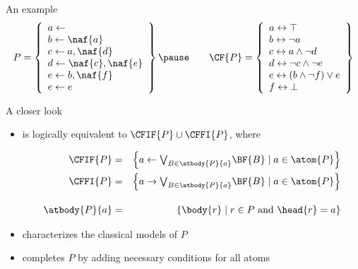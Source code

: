 \begin{frame}{An example}
\[
P
=
\left\{
  \begin{array}{l}
    a \leftarrow                  \\
    b \leftarrow \naf{a}          \\
    c \leftarrow a, \naf{d}       \\
    d \leftarrow \naf{c}, \naf{e} \\
    e \leftarrow b, \naf{f}       \\
    e \leftarrow e
  \end{array}
\right\}
\pause\qquad
\CF{P}
=
\left\{
  \begin{array}{l}
    a \leftrightarrow \top                  \\
    b \leftrightarrow \neg{a}               \\
    c \leftrightarrow a\wedge \neg{d}       \\
    d \leftrightarrow \neg{c}\wedge \neg{e} \\
    e \leftrightarrow (b\wedge \neg{f}) \vee e\\
    f \leftrightarrow \bot
  \end{array}
\right\}
\]
\end{frame}
\begin{frame}{A closer look}
  \bigskip
  \begin{itemize}
  \item {} is logically equivalent to $\CFIF{P}\cup\CFFI{P}$,
    where

    \begin{eqnarray*}
      \CFIF{P}
      & = &
      \left\{a \leftarrow \textstyle{\bigvee_{B\in\atbody{P}{a}}} \BF{B} \mid a\in\atom{P}\right\}
      \\
      \CFFI{P}
      & = &
      \left\{a \rightarrow \textstyle{\bigvee_{B\in\atbody{P}{a}}} \BF{B} \mid a\in\atom{P}\right\}
      \\[10pt]
      \atbody{P}{a}
      & = &
      \left\{\body{r} \mid r\in P\text{ and }\head{r}=a\right\}
    \end{eqnarray*}
    \medskip
  \item<2->  characterizes the classical models of $P$
  \item<2->  completes $P$ by adding necessary conditions for all atoms
\end{itemize}
\end{frame}
